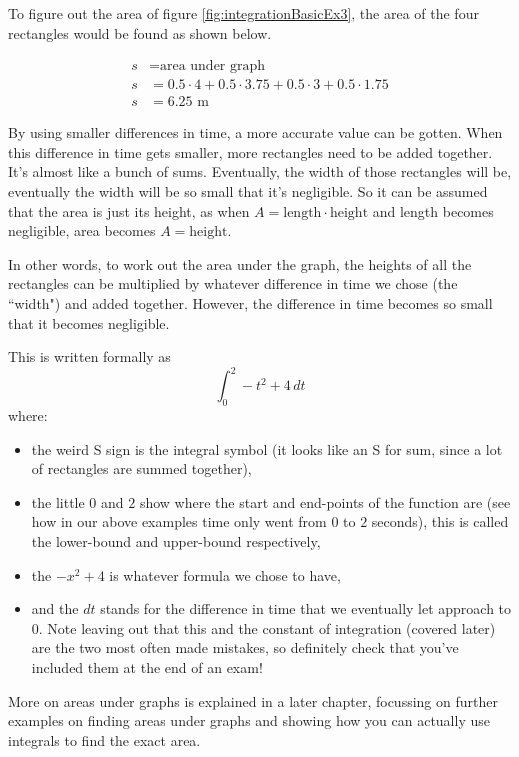 To figure out the area of figure \ref{fig:integrationBasicEx3}, the area of the four rectangles would be found as shown below.

\begin{align*}
	s&=\text{area under graph}\\
	s&=0.5 \cdot 4 + 0.5 \cdot 3.75 + 0.5 \cdot 3 + 0.5 \cdot 1.75\\
	s&=6.25 \text{ m}
\end{align*}

By using smaller differences in time, a more accurate value can be gotten. When this difference in time gets smaller, more rectangles need to be added together. It's almost like a bunch of sums. Eventually, the width of those rectangles will be, eventually the width will be so small that it's negligible. So it can be assumed that the area is just its height, as when $A = \text{length} \cdot \text{height}$ and length becomes negligible, area becomes $A = \text{height}$.

In other words, to work out the area under the graph, the heights of all the rectangles can be multiplied by whatever difference in time we chose (the ``width") and added together. However, the difference in time becomes so small that it becomes negligible.

This is written formally as
\begin{equation*}
	\int_{0}^{2} -t^2+4 \, dt
\end{equation*}
where:
\begin{itemize}
	\item the weird S sign is the integral symbol (it looks like an S for sum, since a lot of rectangles are summed together),
	\item the little $0$ and $2$ show where the start and end-points of the function are (see how in our above examples time only went from $0$ to $2$ seconds), this is called the lower-bound and upper-bound respectively,
	\item the $-x^2+4$ is whatever formula we chose to have,
	\item and the $dt$ stands for the difference in time that we eventually let approach to 0. Note leaving out that this and the constant of integration (covered later) are the two most often made mistakes, so definitely check that you've included them at the end of an exam!
\end{itemize}

More on areas under graphs is explained in a later chapter, focussing on further examples on finding areas under graphs and showing how you can actually use integrals to find the exact area.

